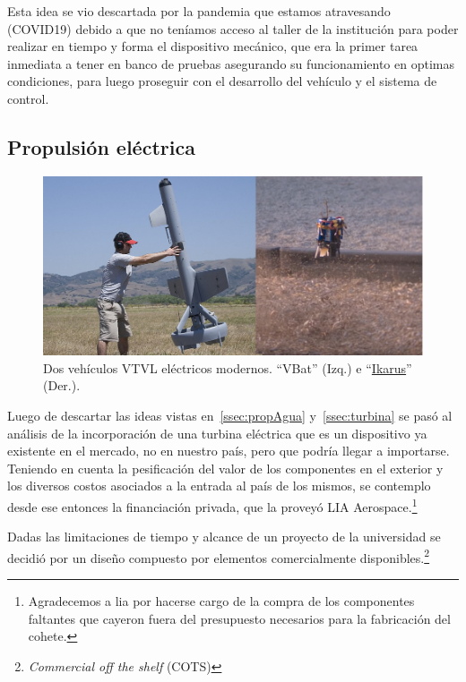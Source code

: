 Esta idea se vio descartada por la pandemia que estamos atravesando (COVID19) debido a que
no teníamos acceso al taller de la institución para poder realizar en tiempo y forma el
dispositivo mecánico, que era la primer tarea inmediata a tener en banco de pruebas
asegurando su funcionamiento en optimas condiciones, para luego proseguir con el desarrollo
del vehículo y el sistema de control.


\subsection{Propulsión eléctrica}\label{ssec:propelectrica}


\begin{figure}[htb]
    \centering
    \includegraphics[width=0.8\linewidth]{fig/vbat_icarus.png}
    \caption{Dos vehículos VTVL eléctricos modernos. ``VBat'' (Izq.) e ``\href{https://hackaday.com/2018/08/31/single-rotor-drone-a-thrust-vectoring-monocopter/}{Ikarus}'' (Der.).}
    \label{fig:vbat_icarus}
\end{figure}

Luego de descartar las ideas vistas en~\ref{ssec:propAgua} y~\ref{ssec:turbina} se pasó al análisis de la incorporación de una turbina eléctrica que es un dispositivo ya existente en el mercado, no en nuestro país, pero que podría llegar a importarse. Teniendo en cuenta la pesificación del valor de los componentes en el exterior y los diversos costos asociados a la entrada al país de los mismos, se contemplo desde ese entonces la financiación privada, que la proveyó LIA Aerospace.\footnote{Agradecemos a \gls{lia} por hacerse cargo de la compra de los componentes faltantes que cayeron fuera del presupuesto necesarios para la fabricación del cohete.} 

Dadas las limitaciones de tiempo y alcance de un proyecto de la universidad se decidió por un diseño compuesto por elementos comercialmente disponibles.\footnote{\textit{Commercial off the shelf} (COTS)}

\medskip

